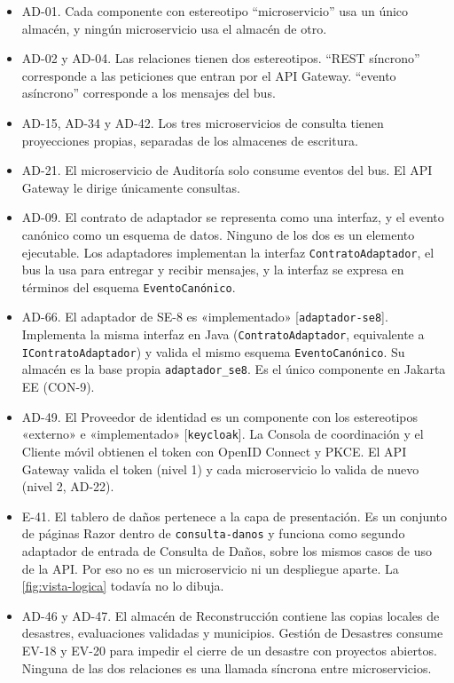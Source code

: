\documentclass[11pt,letterpaper]{article}
\providecommand{\br}{\discretionary{}{}{}}
\begin{document}
\begin{itemize}
  \item AD-01. Cada componente con estereotipo \enquote{microservicio} usa un único almacén, y
        ningún microservicio usa el almacén de otro.
  \item AD-02 y AD-04. Las relaciones tienen dos estereotipos. \enquote{REST síncrono} corresponde a
        las peticiones que entran por el API Gateway. \enquote{evento asíncrono} corresponde a los
        mensajes del bus.
  \item AD-15, AD-34 y AD-42. Los tres microservicios de consulta tienen proyecciones propias,
        separadas de los almacenes de escritura.
  \item AD-21. El microservicio de Auditoría solo consume eventos del bus. El API Gateway le dirige
        únicamente consultas.
  \item AD-09. El contrato de adaptador se representa como una interfaz, y el evento canónico como
        un esquema de datos. Ninguno de los dos es un elemento ejecutable. Los adaptadores
        implementan la interfaz \texttt{ContratoAdaptador}, el bus la usa para entregar y recibir
        mensajes, y la interfaz se expresa en términos del esquema \texttt{EventoCanónico}.
  \item AD-66. El adaptador de SE-8 es «implementado» [\texttt{adaptador-se8}]. Implementa la
        misma interfaz en Java (\texttt{ContratoAdaptador}, equivalente a \texttt{IContratoAdaptador})
        y valida el mismo esquema \texttt{EventoCanónico}. Su almacén es la base propia
        \texttt{adaptador\_\br{}se8}. Es el único componente en Jakarta EE (CON-9).
  \item AD-49. El Proveedor de identidad es un componente con los estereotipos «externo» e
        «implementado» [\texttt{keycloak}]. La Consola de coordinación y el
        Cliente móvil obtienen el token con OpenID Connect y PKCE. El API Gateway valida el token
        (nivel 1) y cada microservicio lo valida de nuevo (nivel 2, AD-22).
  \item E-41. El tablero de daños pertenece a la capa de presentación. Es un conjunto de páginas
        Razor dentro de \texttt{consulta-\br{}danos} y funciona como segundo adaptador de entrada de
        Consulta de Daños, sobre los mismos casos de uso de la API. Por eso no es un microservicio
        ni un despliegue aparte. La \cref{fig:vista-logica} todavía no lo dibuja.
  \item AD-46 y AD-47. El almacén de Reconstrucción contiene las copias locales de desastres,
        evaluaciones validadas y municipios. Gestión de Desastres consume EV-18 y EV-20 para
        impedir el cierre de un desastre con proyectos abiertos. Ninguna de las dos relaciones es
        una llamada síncrona entre microservicios.
\end{itemize}
\end{document}
